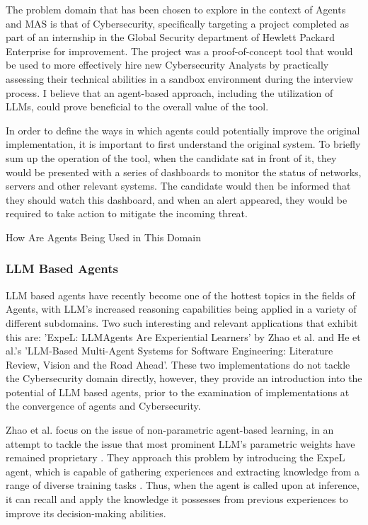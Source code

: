 \documentclass[a4paper,9pt]{scrartcl}
\makeatletter
\renewcommand{\subsection}{\@startsection{subsection}{2}{0mm}
  {0.25\baselineskip} 
  {0.25\baselineskip} 
  {\normalfont\normalsize\bfseries}}
\makeatother
\begin{document}
The problem domain that has been chosen to explore in the context of Agents and MAS is that of
Cybersecurity, specifically targeting a project completed as part of an internship in the Global 
Security department of Hewlett Packard Enterprise for improvement. The project was a proof-of-concept 
tool that would be used to more effectively hire new Cybersecurity Analysts by 
practically assessing their technical abilities in a sandbox environment during the 
interview process. I believe that an agent-based approach, including the utilization 
of LLMs, could prove beneficial to the overall value of the tool.

In order to define the ways in which agents could potentially improve 
the original implementation, it is important to first understand the original system.
To briefly sum up the operation of the tool, when the candidate sat in front of it, they would be 
presented with a series of dashboards to monitor the status of networks, servers and other relevant systems.
The candidate would then be informed that they should watch this dashboard, and when 
an alert appeared, they would be required to take action to mitigate 
the incoming threat.


\subsection{How Are Agents Being Used in This Domain}

\subsubsection{LLM Based Agents}

LLM based agents have recently become one of the hottest topics in the fields of Agents, with 
LLM's increased reasoning capabilities being applied in a variety of 
different subdomains. Two such interesting and relevant applications that exhibit this
are: 'ExpeL: LLMAgents Are Experiential Learners' by Zhao et al. and He et al.'s 'LLM-Based Multi-Agent 
Systems for Software Engineering: Literature Review, Vision and the Road Ahead'. These two 
implementations do not tackle the Cybersecurity domain directly, however, they provide
an introduction into the potential of LLM based agents, prior to the examination of implementations
at the convergence of agents and Cybersecurity.

Zhao et al. focus on the issue of non-parametric agent-based learning, in an attempt to tackle the issue that
most prominent LLM's parametric weights have remained proprietary 
\cite{zhaoExpeLLLMAgents2024}. They approach this problem by introducing the ExpeL
agent, which is capable of gathering experiences and extracting knowledge from a 
range of diverse training tasks \cite{zhaoExpeLLLMAgents2024}. Thus, when the agent 
is called upon at inference, it can recall and apply the knowledge it possesses from
previous experiences to improve its decision-making abilities. 
\end{document}

